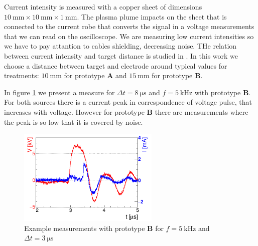 Current intensity is measured with a copper sheet of dimensions $\SI{10}{\milli\meter} \times \SI{10}{\milli\meter} \times \SI{1}{\milli\meter}$. The plasma plume impacts on the sheet that is connected to the current robe that converts the signal in a voltage measurements that we can read on the oscilloscope. We are measuring low current intensities so we have to pay attantion to cables shielding, decreasing noise.
THe relation between current intensity and target distance is studied in \cite{unipd:ceciliaDBD}. In this work we choose a distance between target and electrode around typical values for treatments: $\SI{10}{\milli\meter}$ for prototype \textbf{A} and $\SI{15}{\milli\meter}$ for prototype \textbf{B}.

In figure \ref{fig:tens_curr} we present a measure for $\Delta t = \SI{8}{\micro\second}$ and $f =\SI{5}{\kilo\hertz}$ with prototype \textbf{B}. For both sources there is a current peak in correspondence of voltage pulse, that increases with voltage. However for prototype \textbf{B} there are measurements where the peak is so low that it is covered by noise.
\begin{figure}
\centering
 \includegraphics[width=0.6\textwidth]{Images/Electric/espiccopos_corrente.png}
 \caption{Example measurements with prototype \textbf{B} for $f = \SI{5}{\kilo\hertz}$ and $\Delta t = \SI{3}{\micro\second}$}
 \label{fig:tens_curr}
\end{figure}

